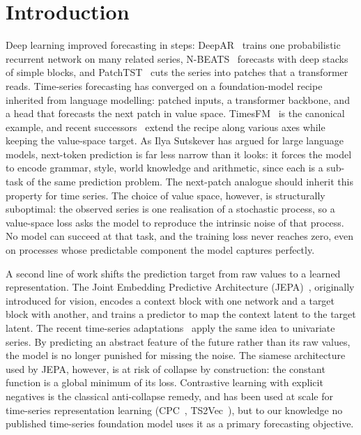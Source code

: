 \section{Introduction}
\label{sec:introduction}

Deep learning improved forecasting in steps:
DeepAR~\citep{salinas2020deepar} trains one probabilistic recurrent
network on many related series, N-BEATS~\citep{oreshkin2020nbeats}
forecasts with deep stacks of simple blocks, and
PatchTST~\citep{nie2023patchtst} cuts the series into patches that a
transformer reads. Time-series forecasting has converged on a
foundation-model recipe inherited from language modelling: patched
inputs, a transformer backbone, and a head that forecasts the next
patch in value space.
TimesFM~\citep{das2024timesfm} is the canonical example, and recent
successors~\citep{ansari2024chronos, goswami2024moment, woo2024moirai,
shi2024timemoe, liu2025sundial, liu2026timers1, mistral2026timestral}
extend the recipe along various axes while keeping the value-space
target. As Ilya Sutskever has
argued for large language models, next-token prediction is far less
narrow than it looks: it forces
the model to encode grammar, style, world knowledge and arithmetic,
since each is a sub-task of the same prediction problem. The
next-patch analogue should inherit this property for time series.
The choice of value space, however, is structurally suboptimal: the
observed series is one realisation of a stochastic process, so a
value-space loss asks the model to reproduce the intrinsic noise of
that process. No model can succeed at that task,
and the training loss never reaches zero, even on processes whose
predictable component the model captures perfectly.

A second line of work shifts the prediction target from raw values to
a learned representation. The Joint Embedding Predictive
Architecture (JEPA)~\citep{assran2023ijepa}, originally introduced
for vision, encodes a context block with one network and a target
block with another, and trains a predictor to map the context latent
to the target latent. The recent time-series
adaptations~\citep{verdenius2024latpfn, ennadir2025tsjepa} apply the
same idea to univariate series. By predicting an abstract feature of
the future rather than its raw values, the model is no longer
punished for missing the noise. The siamese architecture used by
JEPA, however, is at risk of collapse by construction: the constant
function is a global minimum of its loss. Contrastive learning with
explicit negatives is the classical anti-collapse remedy, and has
been used at scale for time-series representation learning
(CPC~\citep{oord2018cpc}, TS2Vec~\citep{yue2022ts2vec}), but to our
knowledge no published time-series foundation model uses it as a
primary forecasting objective.


